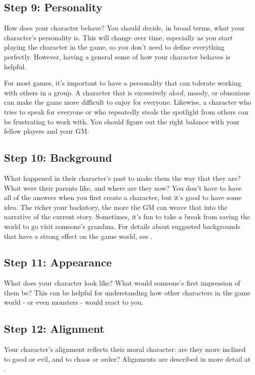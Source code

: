   \subsection{Step 9: Personality}

    How does your character behave?
    You should decide, in broad terms, what your character's personality is.
    This will change over time, especially as you start playing the character in the game, so you don't need to define everything perfectly.
    However, having a general sense of how your character behaves is helpful.

    For most games, it's important to have a personality that can tolerate working with others in a group.
    A character that is excessively aloof, moody, or obnoxious can make the game more difficult to enjoy for everyone.
    Likewise, a character who tries to speak for everyone or who repeatedly steals the spotlight from others can be frustrating to work with.
    You should figure out the right balance with your fellow players and your GM.\@

  \subsection{Step 10: Background}
    What happened in their character's past to make them the way that they are?
    What were their parents like, and where are they now?
    You don't have to have all of the answers when you first create a character, but it's good to have some idea.
    The richer your backstory, the more the GM can weave that into the narrative of the current story.
    Sometimes, it's fun to take a break from saving the world to go visit someone's grandma.
    For details about suggested backgrounds that have a strong effect on the game world, see .

  \subsection{Step 11: Appearance}
    What does your character look like?
    What would someone's first impression of them be?
    This can be helpful for understanding how other characters in the game world - or even monsters - would react to you.

  \subsection{Step 12: Alignment}
    Your character's alignment reflects their moral character: are they more inclined to good or evil, and to chaos or order?
    Alignments are described in more detail at .

